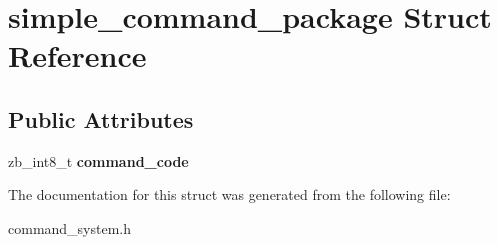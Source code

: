 \hypertarget{structsimple__command__package}{}\section{simple\+\_\+command\+\_\+package Struct Reference}
\label{structsimple__command__package}
\subsection*{Public Attributes}
\begin{DoxyCompactItemize}
\item 
\mbox{\label{structsimple__command__package_a10fccb5be16bf186b6f836f0be1ec659}} 
zb\+\_\+int8\+\_\+t {\bfseries command\+\_\+code}
\end{DoxyCompactItemize}


The documentation for this struct was generated from the following file\+:\begin{DoxyCompactItemize}
\item 
command\+\_\+system.\+h\end{DoxyCompactItemize}
